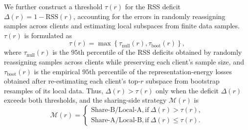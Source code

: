 \documentclass[lettersize,journal]{IEEEtran}
\begin{document}
	We further construct a threshold $\tau(r)$ for the RSS deficit
	$\Delta(r)=1-\mathrm{RSS}(r)$, accounting for the errors in randomly reassigning samples across clients and estimating local subspaces from finite data samples.
	$\tau(r)$ is formulated as 
	\begin{equation}
		\tau(r)=\max
		\left\{
		\tau_{\mathrm{null}}(r),
		\tau_{\mathrm{boot}}(r)
		\right\},
		\label{eq:sass_threshold}
	\end{equation}
	where $\tau_{\mathrm{null}}(r)$ is the $95$th percentile of the RSS deficits obtained by randomly reassigning samples across clients while preserving each client's sample size, and $\tau_{\mathrm{boot}}(r)$ is the empirical $95$th percentile of the representation-energy losses obtained after re-estimating each client's top-$r$ subspace from bootstrap resamples of its local data. Thus, $\Delta(r)>\tau(r)$ only when the deficit $\Delta(r)$ exceeds both thresholds, and the sharing-side strategy $\mathcal{M}(r)$ is
\begin{equation}
	\mathcal{M}(r)
	=
	\begin{cases}
		\text{Share-B/Local-A}, \mathrm{if} \ \Delta(r) \!>\! \tau(r),\\
		\text{Share-A/Local-B}, \mathrm{if} \ \Delta(r) \!\le\! \tau(r).
	\end{cases}
	\label{eq:selection_rule}
\end{equation}
\end{document}
